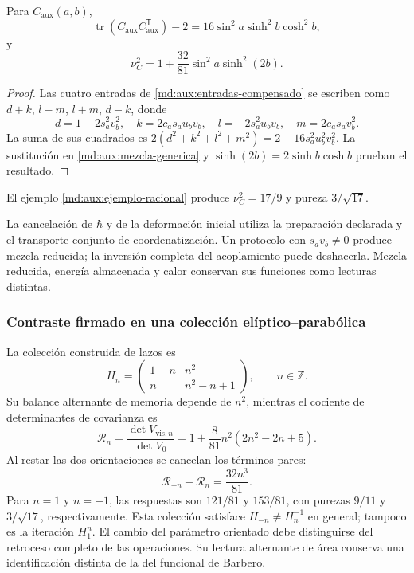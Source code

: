 \begin{corollary}
\label{md:aux:cor-mezcla}
Para $C_{\mathrm{aux}}(a,b)$,
\begin{equation}
 \operatorname{tr}(C_{\mathrm{aux}}C_{\mathrm{aux}}^{\mathsf T})-2
 =16\sin^2a\sinh^2b\cosh^2b,
 \label{md:aux:traza-cuadratica}
\end{equation}
y
\begin{equation}
 \boxed{\nu_C^2=1+\frac{32}{81}\sin^2a\sinh^2(2b).}
 \label{md:aux:mezcla-compensado}
\end{equation}
\end{corollary}
\begin{proof}
Las cuatro entradas de \eqref{md:aux:entradas-compensado} se
escriben como $d+k$, $l-m$, $l+m$, $d-k$, donde
\[
 d=1+2s_a^2v_b^2,\quad k=2c_as_au_bv_b,\quad
 l=-2s_a^2u_bv_b,\quad m=2c_as_av_b^2.
\]
La suma de sus cuadrados es
$2(d^2+k^2+l^2+m^2)=2+16s_a^2u_b^2v_b^2$.
La sustitución en \eqref{md:aux:mezcla-generica} y
$\sinh(2b)=2\sinh b\cosh b$ prueban el resultado.
\end{proof}
El ejemplo \eqref{md:aux:ejemplo-racional} produce
$\nu_C^2=17/9$ y pureza $3/\sqrt{17}$.

La cancelación de $\hbar$ y de la deformación inicial utiliza
la preparación declarada y el transporte conjunto de coordenatización.
Un protocolo con $s_av_b\ne0$ produce mezcla reducida; la
inversión completa del acoplamiento puede deshacerla. Mezcla
reducida, energía almacenada y calor conservan sus funciones
como lecturas distintas.

\subsubsection{Contraste firmado en una colección elíptico--parabólica}
\label{md:aux:familia-hn}

La colección construida de lazos es
\begin{equation}
 H_n=\begin{pmatrix}1+n&n^2\\n&n^2-n+1\end{pmatrix},
 \qquad n\in\mathbb Z.
 \label{md:aux:hn}
\end{equation}
Su balance alternante de memoria depende de $n^2$, mientras el
cociente de determinantes de covarianza es
\begin{equation}
 \mathcal R_n=\frac{\det V_{\mathrm{vis},n}}{\det V_0}
 =1+\frac8{81}n^2(2n^2-2n+5).
 \label{md:aux:covarianza-hn}
\end{equation}
Al restar las dos orientaciones se cancelan los términos pares:
\begin{equation}
 \boxed{\mathcal R_{-n}-\mathcal R_n=\frac{32n^3}{81}.}
 \label{md:aux:diferencia-direccional}
\end{equation}
Para $n=1$ y $n=-1$, las respuestas son $121/81$ y $153/81$,
con purezas $9/11$ y $3/\sqrt{17}$, respectivamente.
Esta colección satisface $H_{-n}\ne H_n^{-1}$ en general;
tampoco es la iteración $H_1^n$. El cambio del parámetro
orientado debe distinguirse del retroceso completo de las
operaciones. Su lectura alternante de área conserva una
identificación distinta de la del funcional de Barbero.

